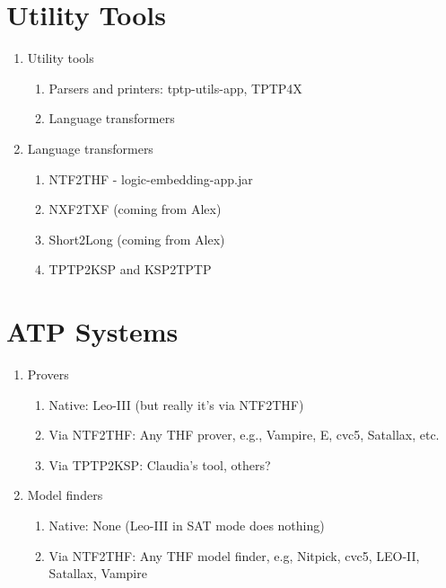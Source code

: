 \documentclass[runningheads]{llncs}
\begin{document}
\section{Utility Tools}
\label{UtilityTools}

\begin{enumerate}
\item Utility tools
      \begin{enumerate}
      \item Parsers and printers: tptp-utils-app, TPTP4X
      \item Language transformers
      \end{enumerate}

\item Language transformers
      \begin{enumerate}
      \item NTF2THF - logic-embedding-app.jar
      \item NXF2TXF (coming from Alex)
      \item Short2Long (coming from Alex)
      \item TPTP2KSP and KSP2TPTP
      \end{enumerate}
\end{enumerate}

\section{ATP Systems}
\label{ATPSystems}

      \begin{enumerate}
      \item Provers
            \begin{enumerate}
            \item  Native: Leo-III (but really it's via NTF2THF)
            \item Via NTF2THF: Any THF prover, e.g., Vampire, E, cvc5, Satallax, etc.
            \item Via TPTP2KSP: Claudia's tool, others?
            \end{enumerate}
      \item Model finders
            \begin{enumerate}
            \item Native: None (Leo-III in SAT mode does nothing)
            \item Via NTF2THF: Any THF model finder, e.g, Nitpick, cvc5, LEO-II, Satallax, Vampire
            \end{enumerate}
      \end{enumerate}
\end{document}
